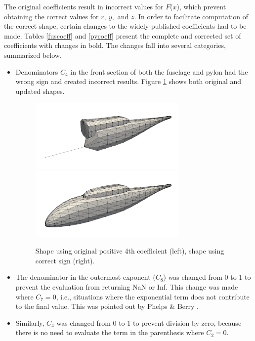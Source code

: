 \documentclass[journal]{new-aiaa}
\begin{document}
The original coefficients result in incorrect values for $F$($x$), which prevent obtaining the correct values for $r, \ y,$ and $z$. In order to facilitate computation of the correct shape, certain changes to the
widely-published coefficients had to be made.
Tables \ref{fuscoeff} and \ref{pycoeff} present the complete and corrected set of coefficients with changes in bold.
The changes fall into several categories, summarized below.
\begin{itemize}
\item Denominators $C_{4}$ in the front section of both the fuselage and pylon had the wrong sign
and created incorrect results.
Figure \ref{badc4} shows both original and updated shapes.
\begin{figure} \begin{centering}
\includegraphics[width=3.0in]{img_badc4.png}
\includegraphics[width=3.0in]{img_good.png}
\caption{Shape using original positive 4th coefficient (left), shape using correct sign (right).}
\label{badc4}
\end{centering}\end{figure}%
\item The denominator in the outermost exponent ($C_{8}$) was changed from 0 to 1 to prevent the evaluation from returning NaN or Inf.
This change was made where $C_{7}=0$, i.e., situations where the exponential term does not contribute to the final value.
This was pointed out by Phelps \& Berry \cite{nasa87762}.
\item Similarly, $C_{4}$ was changed from 0 to 1 to prevent division by zero, because
there is no need to evaluate the term in the parenthesis where $C_{2}=0$.

\end{itemize}
\end{document}
